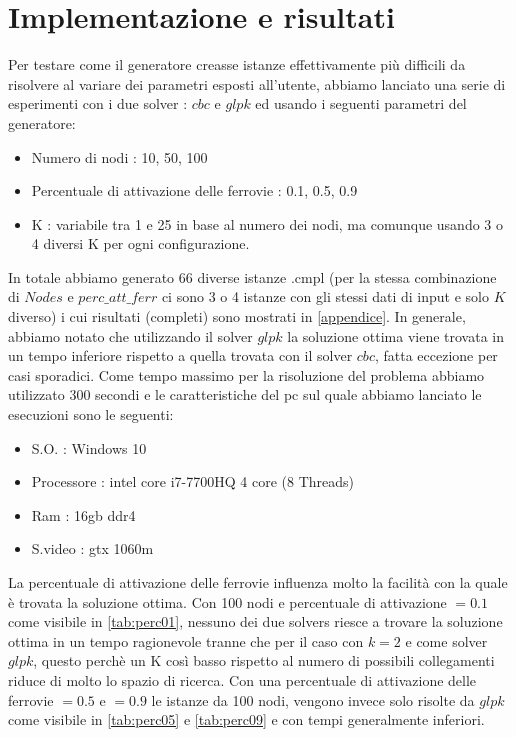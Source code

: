 \documentclass{article}
\begin{document}
\section{Implementazione e risultati}
Per testare come il generatore creasse istanze effettivamente più difficili da risolvere al variare dei parametri esposti all'utente, abbiamo lanciato una serie di esperimenti con i due solver : $cbc$ e $glpk$ ed usando i seguenti parametri del generatore:
\begin{itemize}
    \item Numero di nodi : 10, 50, 100
    \item Percentuale di attivazione delle ferrovie : 0.1, 0.5, 0.9
    \item K : variabile tra 1 e 25 in base al numero dei nodi, ma comunque usando 3 o 4 diversi K per ogni configurazione.
\end{itemize}
In totale abbiamo generato 66 diverse istanze .cmpl (per la stessa combinazione di $Nodes$ e $perc\_att\_ferr$ ci sono 3 o 4 istanze con gli stessi dati di input e solo $K$ diverso) i cui risultati (completi) sono mostrati in \cref{appendice}. In generale, abbiamo notato che utilizzando il solver $glpk$ la soluzione ottima viene trovata in un tempo inferiore rispetto a quella trovata con il solver $cbc$, fatta eccezione per casi sporadici. Come tempo massimo per la risoluzione del problema abbiamo utilizzato 300 secondi e le caratteristiche del pc sul quale abbiamo lanciato le esecuzioni sono le seguenti:
\begin{itemize}
    \item S.O. : Windows 10
    \item Processore : intel core i7-7700HQ 4 core (8 Threads)
    \item Ram : 16gb ddr4
    \item S.video : gtx 1060m
\end{itemize}
La percentuale di attivazione delle ferrovie influenza molto la facilità con la quale è trovata la soluzione ottima. Con 100 nodi e percentuale di attivazione $= 0.1$ come visibile in \cref{tab:perc01}, nessuno dei due solvers riesce a trovare la soluzione ottima in un tempo ragionevole tranne che per il caso con $k = 2$ e come solver $glpk$, questo perchè un K così basso rispetto al numero di possibili collegamenti riduce di molto lo spazio di ricerca. Con una percentuale di attivazione delle ferrovie $= 0.5$ e $=0.9$ le istanze da 100 nodi, vengono invece solo risolte da $glpk$ come visibile in \cref{tab:perc05} e \cref{tab:perc09} e con tempi generalmente inferiori.
\end{document}
